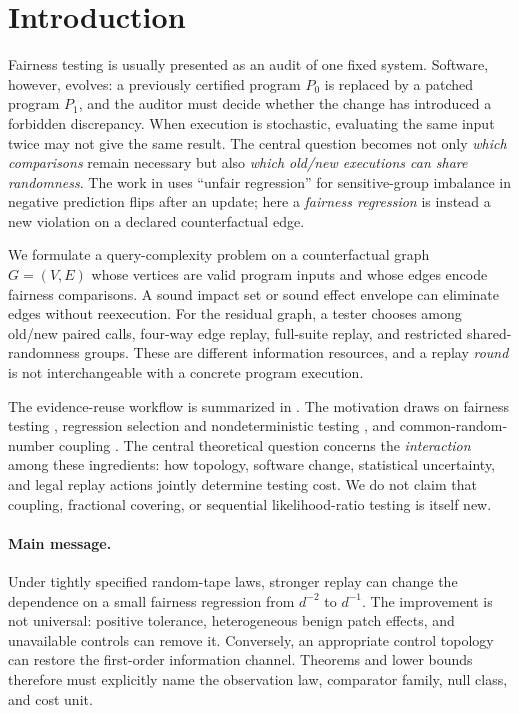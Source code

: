 \section{Introduction}
Fairness testing is usually presented as an audit of one fixed system. Software, however, evolves: a previously certified program $P_0$ is replaced by a patched program $P_1$, and the auditor must decide whether the change has introduced a forbidden discrepancy. When execution is stochastic, evaluating the same input twice may not give the same result. The central question becomes not only \emph{which comparisons} remain necessary but also \emph{which old/new executions can share randomness}. The work in \cite{BuselliEtAl2024} uses ``unfair regression'' for sensitive-group imbalance in negative prediction flips after an update; here a \emph{fairness regression} is instead a new violation on a declared counterfactual edge.

We formulate a query-complexity problem on a counterfactual graph $G=(V,E)$ whose vertices are valid program inputs and whose edges encode fairness comparisons. A sound impact set or sound effect envelope can eliminate edges without reexecution. For the residual graph, a tester chooses among old/new paired calls, four-way edge replay, full-suite replay, and restricted shared-randomness groups. These are different information resources, and a replay \emph{round} is not interchangeable with a concrete program execution.

The evidence-reuse workflow is summarized in . The motivation draws on fairness testing \cite{GalhotraBrunMeliou2017,UdeshiAroraChattopadhyay2018,AlbarghouthiEtAl2017}, regression selection and nondeterministic testing \cite{RothermelHarrold1996,YooHarman2012,YuanLinShi2026}, and common-random-number coupling \cite{GlassermanYao1992,BartheEtAl2017}. The central theoretical question concerns the \emph{interaction} among these ingredients: how topology, software change, statistical uncertainty, and legal replay actions jointly determine testing cost. We do not claim that coupling, fractional covering, or sequential likelihood-ratio testing is itself new.

\paragraph{Main message.} Under tightly specified random-tape laws, stronger replay can change the dependence on a small fairness regression from $d^{-2}$ to $d^{-1}$. The improvement is not universal: positive tolerance, heterogeneous benign patch effects, and unavailable controls can remove it. Conversely, an appropriate control topology can restore the first-order information channel. Theorems and lower bounds therefore must explicitly name the observation law, comparator family, null class, and cost unit.

